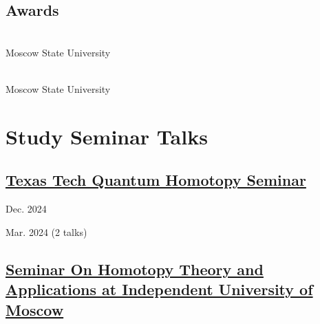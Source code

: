 \documentclass[11pt,letterpaper]{report}
\begin{document}
    \subsection*{Awards}

    \begin{tablist}

        \item[2019] \\ Moscow State University
        \item[2018] \\ Moscow State University

    \end{tablist}


    
    
        
       
    
    
    
    
    \section*{Study Seminar Talks}
    
    \subsection*{\href{https://researchseminars.org/seminar/HomotopyTheoryAndApps}{Texas Tech Quantum Homotopy Seminar}}
    
    \begin{tablist}
    
    \item{Dec. 2024} 
    
     \item{Mar. 2024}  (2 talks)
     
     \end{tablist}
    
    \subsection*{\href{https://researchseminars.org/seminar/HomotopyTheoryAndApps}{Seminar On Homotopy Theory and Applications at Independent University of Moscow}}
    
\end{document}
